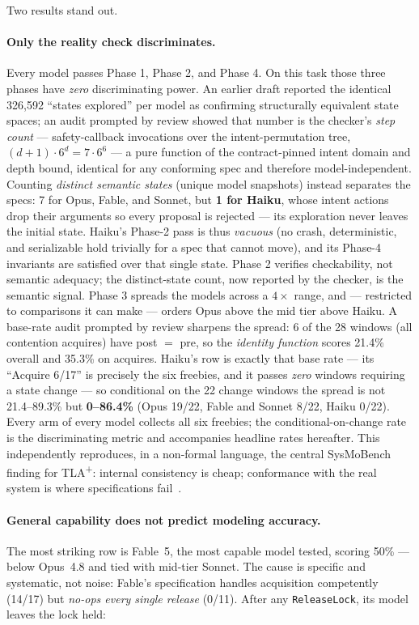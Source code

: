\documentclass[11pt]{article}
\newcommand{\tlaplus}{TLA\texorpdfstring{\textsuperscript{+}}{+}}
\begin{document}
Two results stand out.

\paragraph{Only the reality check discriminates.}
Every model passes Phase 1, Phase 2, and Phase 4. On this task those three
phases have \emph{zero} discriminating power. An earlier draft reported the
identical 326{,}592 ``states explored'' per model as confirming structurally
equivalent state spaces; an audit prompted by review showed that number is the
checker's \emph{step count} --- safety-callback invocations over the
intent-permutation tree, $(d{+}1)\cdot 6^{d} = 7\cdot 6^{6}$ --- a pure
function of the contract-pinned intent domain and depth bound, identical for
any conforming spec and therefore model-independent. Counting \emph{distinct
semantic states} (unique model snapshots) instead separates the specs: 7 for
Opus, Fable, and Sonnet, but \textbf{1 for Haiku}, whose intent actions drop
their arguments so every proposal is rejected --- its exploration never leaves
the initial state. Haiku's Phase-2 pass is thus \emph{vacuous} (no crash,
deterministic, and serializable hold trivially for a spec that cannot move),
and its Phase-4 invariants are satisfied over that single state. Phase 2
verifies checkability, not semantic adequacy; the distinct-state count, now
reported by the checker, is the semantic signal. Phase 3 spreads the models
across a $4\times$ range, and --- restricted to comparisons it can make ---
orders Opus above the mid tier above Haiku. A base-rate audit prompted by
review sharpens the spread: 6 of the 28 windows (all contention acquires)
have post $=$ pre, so the \emph{identity function} scores 21.4\% overall and
35.3\% on acquires. Haiku's row is exactly that base rate --- its
``Acquire 6/17'' is precisely the six freebies, and it passes \emph{zero}
windows requiring a state change --- so conditional on the 22 change windows
the spread is not 21.4--89.3\% but \textbf{0--86.4\%} (Opus 19/22, Fable and
Sonnet 8/22, Haiku 0/22). Every arm of every model collects all six
freebies; the conditional-on-change rate is the discriminating metric and
accompanies headline rates hereafter. This independently reproduces, in
a non-formal language, the central SysMoBench finding for \tlaplus{}: internal
consistency is cheap; conformance with the real system is where specifications
fail~\cite{sigops2026}.

\paragraph{General capability does not predict modeling accuracy.}
The most striking row is Fable~5, the most capable model tested, scoring
50\% --- below Opus~4.8 and tied with mid-tier Sonnet. The cause is specific
and systematic, not noise: Fable's specification handles acquisition
competently (14/17) but \emph{no-ops every single release} (0/11). After any
\texttt{ReleaseLock}, its model leaves the lock held:
\end{document}
